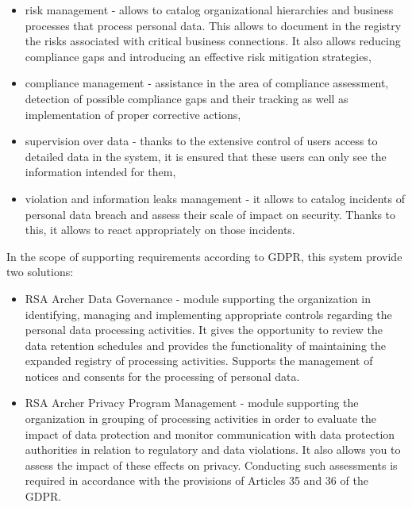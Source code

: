 \documentclass[en, noamssymb]{mgr}
\begin{document}
\begin{itemize}

\item risk management - allows to catalog organizational hierarchies and business processes that process personal data. This allows to document in the registry the risks associated with critical business connections. It also allows reducing compliance gaps and introducing an effective risk mitigation strategies,

\item compliance management - assistance in the area of compliance assessment, detection of possible compliance gaps and their tracking as well as implementation of proper corrective actions,

\item supervision over data - thanks to the extensive control of users access to detailed data in the system, it is ensured that these users can only see the information intended for them,

\item violation and information leaks management - it allows to catalog incidents of personal data breach and assess their scale of impact on security. Thanks to this, it allows to react appropriately on those incidents.

\end{itemize}

In the scope of supporting requirements according to GDPR, this system provide two solutions:

\begin{itemize}

\item RSA Archer Data Governance - module supporting the organization in identifying, managing and implementing appropriate controls regarding the personal data processing activities. It gives the opportunity to review the data retention schedules and provides the functionality of maintaining the expanded registry of processing activities. Supports the management of notices and consents for the processing of personal data.

\item RSA Archer Privacy Program Management - module supporting the organization in grouping of processing activities in order to evaluate the impact of data protection and monitor communication with data protection authorities in relation to regulatory and data violations. It also allows you to assess the impact of these effects on privacy. Conducting such assessments is required in accordance with the provisions of Articles 35 and 36 of the GDPR. 

\end{itemize}
\end{document}
